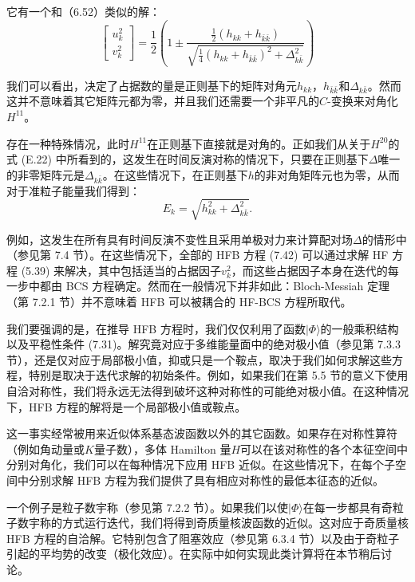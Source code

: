 它有一个和（6.52）类似的解：
\[
\begin{bmatrix}u^{2}_{k}\\
v^{2}_{k}
\end{bmatrix}=\frac{1}{2}\left(1\pm\frac{\frac{1}{2}(h_{kk}+h_{\bar{k}\bar{k}})}{\sqrt{\frac{1}{4}(h_{kk}+h_{\bar{k}\bar{k}})^{2}+\Delta^{2}_{k\bar{k}}}}\right)
\]

我们可以看出，决定了占据数的量是正则基下的矩阵对角元$h_{kk}$，$h_{\bar{k}\bar{k}}$和$\Delta_{k\bar{k}}$。然而这并不意味着其它矩阵元都为零，并且我们还需要一个非平凡的$C$-变换来对角化$H^{11}$。

存在一种特殊情况，此时$H^{11}$在正则基下直接就是对角的。正如我们从关于$H^{20}$的式 (E.22) 中所看到的，这发生在时间反演对称的情况下，只要在正则基下$\Delta$唯一的非零矩阵元是$\Delta_{k\bar{k}}$。在这些情况下，在正则基下$h$的非对角矩阵元也为零，从而对于准粒子能量我们得到：
\begin{equation}
E_{k}=\sqrt{h^{2}_{kk}+\Delta^{2}_{k\bar{k}}}.\label{eq:=0051C6=007C92=005B50=0080FD=0091CF_=005BF9=0089D2}
\end{equation}

例如，这发生在所有具有时间反演不变性且采用单极对力来计算配对场$\Delta$的情形中（参见第 7.4 节）。在这些情况下，全部的
HFB 方程 (7.42) 可以通过求解 HF 方程 (5.39) 来解决，其中包括适当的占据因子$v^{2}_{k}$，而这些占据因子本身在迭代的每一步中都由
BCS 方程确定。然而在一般情况下并非如此：Bloch-Messiah 定理（第 7.2.1 节）并不意味着 HFB 可以被耦合的
HF-BCS 方程所取代\cite{Go79}。

我们要强调的是，在推导 HFB 方程时，我们仅仅利用了函数$|\Phi\rangle$的一般乘积结构以及平稳性条件 (7.31)。解究竟对应于多维能量面中的绝对极小值（参见第
7.3.3 节），还是仅对应于局部极小值，抑或只是一个鞍点，取决于我们如何求解这些方程，特别是取决于迭代求解的初始条件。例如，如果我们在第
5.5 节的意义下使用自洽对称性，我们将永远无法得到破坏这种对称性的可能绝对极小值。在这种情况下，HFB 方程的解将是一个局部极小值或鞍点。

这一事实经常被用来近似体系基态波函数以外的其它函数。如果存在对称性算符（例如角动量或$K$量子数），多体 Hamilton 量$H$可以在该对称性的各个本征空间中分别对角化，我们可以在每种情况下应用
HFB 近似。在这些情况下，在每个子空间中分别求解 HFB 方程为我们提供了具有相应对称性的最低本征态的近似。

一个例子是粒子数宇称（参见第 7.2.2 节）。如果我们以使$|\Phi\rangle$在每一步都具有奇粒子数宇称的方式运行迭代，我们将得到奇质量核波函数的近似。这对应于奇质量核
HFB 方程的自洽解\cite{RBM70,RMB74}。它特别包含了阻塞效应（参见第 6.3.4 节）以及由于奇粒子引起的平均势的改变（极化效应）。在实际中如何实现此类计算将在本节稍后讨论。

